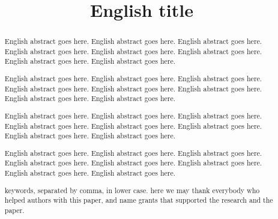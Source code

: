 \documentclass[intlimits,twoside,a4paper,11pt]{article}
\begin{document}

\begin{translatedpart}
\title{English title}



\maketranslatedtitle

\begin{abstract}
English abstract goes here. English abstract goes here. English abstract goes here. English abstract goes here.
English abstract goes here. English abstract goes here. English abstract goes here. English abstract goes here.

English abstract goes here. English abstract goes here. English abstract goes here. English abstract goes here.
English abstract goes here. English abstract goes here. English abstract goes here. English abstract goes here.


English abstract goes here. English abstract goes here. English abstract goes here. English abstract goes here.
English abstract goes here. English abstract goes here. English abstract goes here. English abstract goes here.

English abstract goes here. English abstract goes here. English abstract goes here. English abstract goes here.
English abstract goes here. English abstract goes here. English abstract goes here. English abstract goes here.

\keywords keywords, separated by comma, in lower case.
\autocitationexample
\acknowledgements here we may thank everybody who helped authors with this paper, and name grants that supported the research and the paper.
\end{abstract}


\end{translatedpart}

\makekioauthors
\end{document}
